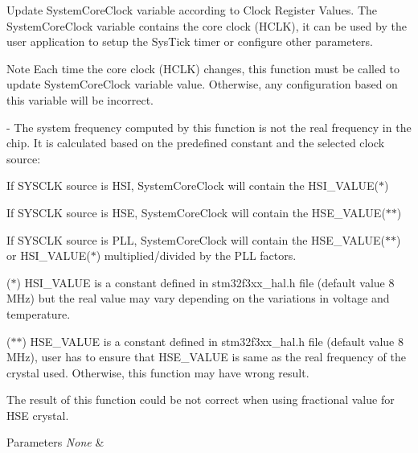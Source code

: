 Update System\+Core\+Clock variable according to Clock Register Values. The System\+Core\+Clock variable contains the core clock (H\+C\+LK), it can be used by the user application to setup the Sys\+Tick timer or configure other parameters. 

\begin{DoxyNote}{Note}
Each time the core clock (H\+C\+LK) changes, this function must be called to update System\+Core\+Clock variable value. Otherwise, any configuration based on this variable will be incorrect.

-\/ The system frequency computed by this function is not the real frequency in the chip. It is calculated based on the predefined constant and the selected clock source\+:
\end{DoxyNote}

\begin{DoxyItemize}
\item If S\+Y\+S\+C\+LK source is H\+SI, System\+Core\+Clock will contain the H\+S\+I\+\_\+\+V\+A\+L\+U\+E($\ast$)
\item If S\+Y\+S\+C\+LK source is H\+SE, System\+Core\+Clock will contain the H\+S\+E\+\_\+\+V\+A\+L\+U\+E($\ast$$\ast$)
\item If S\+Y\+S\+C\+LK source is P\+LL, System\+Core\+Clock will contain the H\+S\+E\+\_\+\+V\+A\+L\+U\+E($\ast$$\ast$) or H\+S\+I\+\_\+\+V\+A\+L\+U\+E($\ast$) multiplied/divided by the P\+LL factors.
\end{DoxyItemize}

($\ast$) H\+S\+I\+\_\+\+V\+A\+L\+UE is a constant defined in stm32f3xx\+\_\+hal.\+h file (default value 8 M\+Hz) but the real value may vary depending on the variations in voltage and temperature.

($\ast$$\ast$) H\+S\+E\+\_\+\+V\+A\+L\+UE is a constant defined in stm32f3xx\+\_\+hal.\+h file (default value 8 M\+Hz), user has to ensure that H\+S\+E\+\_\+\+V\+A\+L\+UE is same as the real frequency of the crystal used. Otherwise, this function may have wrong result.


\begin{DoxyItemize}
\item The result of this function could be not correct when using fractional value for H\+SE crystal.
\end{DoxyItemize}


\begin{DoxyParams}{Parameters}
{\em None} & \\
\hline
\end{DoxyParams}

